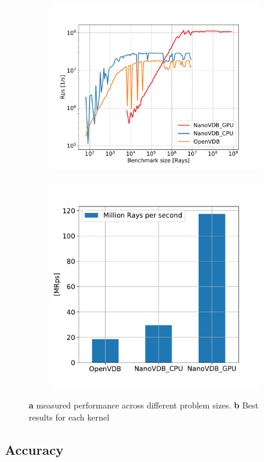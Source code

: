 \begin{figure}[h]
    \begin{subfigure}{0.5\textwidth}
    \includegraphics[width=1\linewidth]{res/results.pdf} 
    \caption{}
    
\end{subfigure}
    \begin{subfigure}{0.4\textwidth}
    \includegraphics[width=1\linewidth]{res/barplot.pdf}
    \caption{}
\end{subfigure}

\caption{\textbf{a} measured performance across different problem sizes. \textbf{b} Best results for each kernel}
\label{fig:results}
\end{figure}

\subsection{Accuracy}



\nocite{openvdb}
\nocite{nanovdb}
